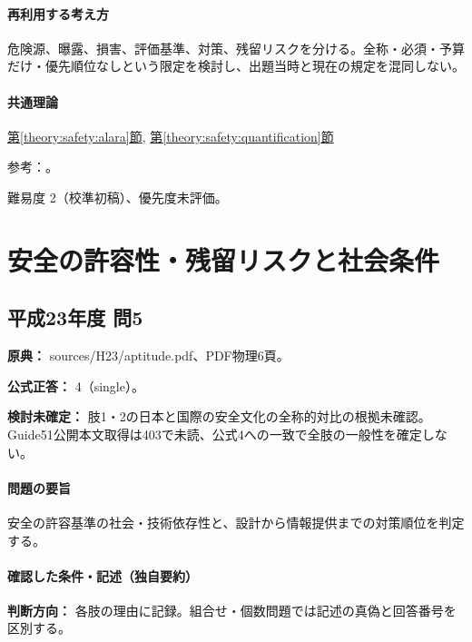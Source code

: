 \paragraph{再利用する考え方} 危険源、曝露、損害、評価基準、対策、残留リスクを分ける。全称・必須・予算だけ・優先順位なしという限定を検討し、出題当時と現在の規定を混同しない。

\paragraph{共通理論} \hyperref[theory:safety:alara]{第\ref*{theory:safety:alara}節}, \hyperref[theory:safety:quantification]{第\ref*{theory:safety:quantification}節}

\par 参考：\cite{saf_icrp103,saf_icrpaedia,saf_food2023}。

\par 難易度 2（校準初稿）、優先度未評価。

\section{安全の許容性・残留リスクと社会条件}

\subsection{平成23年度 問5}
\label{q:h23-reg-apt-05}

\noindent\textbf{原典：} sources/H23/aptitude.pdf、PDF物理6頁。

\textbf{公式正答：} 4（single）。

\par\textbf{検討未確定：} 肢1・2の日本と国際の安全文化の全称的対比の根拠未確認。Guide51公開本文取得は403で未読、公式4への一致で全肢の一般性を確定しない。

\paragraph{問題の要旨} 安全の許容基準の社会・技術依存性と、設計から情報提供までの対策順位を判定する。

\paragraph{確認した条件・記述（独自要約）}\mbox{}\par

\noindent\textbf{判断方向：} 各肢の理由に記録。組合せ・個数問題では記述の真偽と回答番号を区別する。\par

